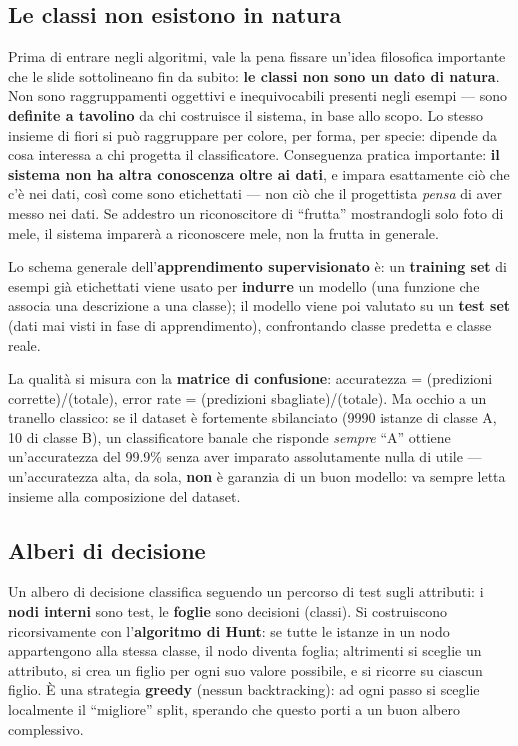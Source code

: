\documentclass[11pt,a4paper]{article}
\begin{document}
\subsection{Le classi non esistono in natura}

Prima di entrare negli algoritmi, vale la pena fissare un'idea filosofica importante che le slide sottolineano fin da subito: \textbf{le classi non sono un dato di natura}. Non sono raggruppamenti oggettivi e inequivocabili presenti negli esempi --- sono \textbf{definite a tavolino} da chi costruisce il sistema, in base allo scopo. Lo stesso insieme di fiori si può raggruppare per colore, per forma, per specie: dipende da cosa interessa a chi progetta il classificatore. Conseguenza pratica importante: \textbf{il sistema non ha altra conoscenza oltre ai dati}, e impara esattamente ciò che c'è nei dati, così come sono etichettati --- non ciò che il progettista \emph{pensa} di aver messo nei dati. Se addestro un riconoscitore di ``frutta'' mostrandogli solo foto di mele, il sistema imparerà a riconoscere mele, non la frutta in generale.

Lo schema generale dell'\textbf{apprendimento supervisionato} è: un \textbf{training set} di esempi già etichettati viene usato per \textbf{indurre} un modello (una funzione che associa una descrizione a una classe); il modello viene poi valutato su un \textbf{test set} (dati mai visti in fase di apprendimento), confrontando classe predetta e classe reale.

La qualità si misura con la \textbf{matrice di confusione}: accuratezza = (predizioni corrette)/(totale), error rate = (predizioni sbagliate)/(totale). Ma occhio a un tranello classico: se il dataset è fortemente sbilanciato (9990 istanze di classe A, 10 di classe B), un classificatore banale che risponde \emph{sempre} ``A'' ottiene un'accuratezza del 99.9\% senza aver imparato assolutamente nulla di utile --- un'accuratezza alta, da sola, \textbf{non} è garanzia di un buon modello: va sempre letta insieme alla composizione del dataset.

\subsection{Alberi di decisione}

Un albero di decisione classifica seguendo un percorso di test sugli attributi: i \textbf{nodi interni} sono test, le \textbf{foglie} sono decisioni (classi). Si costruiscono ricorsivamente con l'\textbf{algoritmo di Hunt}: se tutte le istanze in un nodo appartengono alla stessa classe, il nodo diventa foglia; altrimenti si sceglie un attributo, si crea un figlio per ogni suo valore possibile, e si ricorre su ciascun figlio. È una strategia \textbf{greedy} (nessun backtracking): ad ogni passo si sceglie localmente il ``migliore'' split, sperando che questo porti a un buon albero complessivo.
\end{document}
